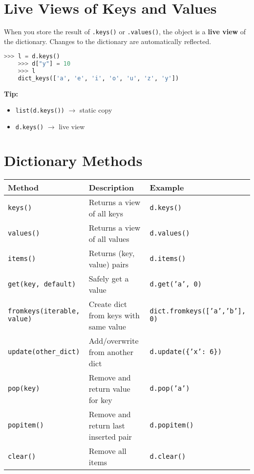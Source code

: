 \section{Live Views of Keys and Values}
When you store the result of \texttt{.keys()} or \texttt{.values()}, the object is a \textbf{live view} of the dictionary.  
Changes to the dictionary are automatically reflected.

\begin{lstlisting}[language=Python]
	>>> l = d.keys()
	>>> d["y"] = 10
	>>> l
	dict_keys(['a', 'e', 'i', 'o', 'u', 'z', 'y'])
\end{lstlisting}

\textbf{Tip:}
\begin{itemize}
	\item \texttt{list(d.keys())} $\rightarrow$ static copy
	\item \texttt{d.keys()} $\rightarrow$ live view
\end{itemize}

\section{Dictionary Methods}
\begin{center}
	\begin{tabular}{|l|l|l|}
		\hline
		\textbf{Method} & \textbf{Description} & \textbf{Example} \\
		\hline
		\texttt{keys()} & Returns a view of all keys & \texttt{d.keys()} \\
		\texttt{values()} & Returns a view of all values & \texttt{d.values()} \\
		\texttt{items()} & Returns (key, value) pairs & \texttt{d.items()} \\
		\texttt{get(key, default)} & Safely get a value & \texttt{d.get('a', 0)} \\
		\texttt{fromkeys(iterable, value)} & Create dict from keys with same value & \texttt{dict.fromkeys(['a','b'], 0)} \\
		\texttt{update(other\_dict)} & Add/overwrite from another dict & \texttt{d.update(\{'x': 6\})} \\
		\texttt{pop(key)} & Remove and return value for key & \texttt{d.pop('a')} \\
		\texttt{popitem()} & Remove and return last inserted pair & \texttt{d.popitem()} \\
		\texttt{clear()} & Remove all items & \texttt{d.clear()} \\
		\hline
	\end{tabular}
\end{center}

